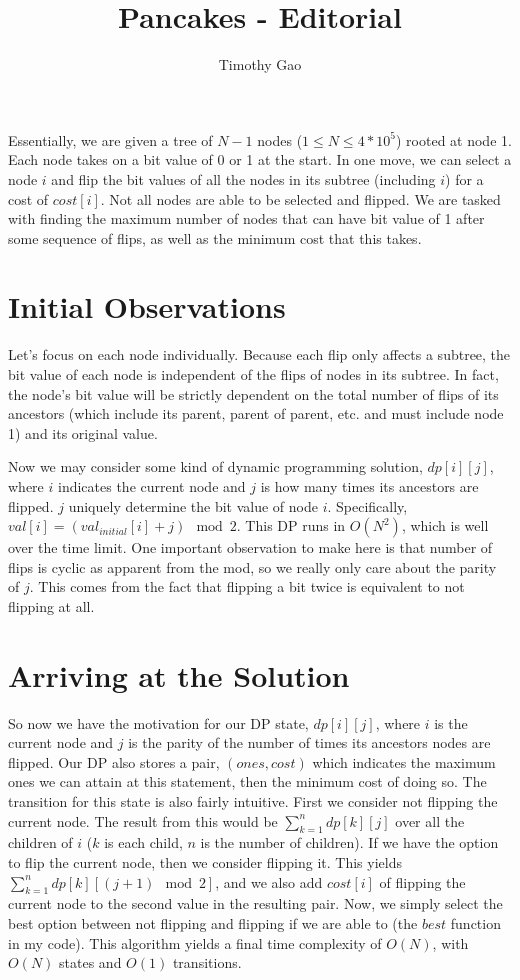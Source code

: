 \documentclass[15pt]{article}
\title{Pancakes - Editorial}
\author{Timothy Gao}
\date{}
\begin{document}
\maketitle

Essentially, we are given a tree of $N-1$ nodes ($1 \leq N \leq 4 * 10^5$) rooted at node 1. Each node takes on a bit value of 0 or 1 at the start. In one move, we can select a node $i$ and flip the bit values of all the nodes in its subtree (including $i$) for a cost of $cost[i]$. Not all nodes are able to be selected and flipped. We are tasked with finding the maximum number of nodes that can have bit value of 1 after some sequence of flips, as well as the minimum cost that this takes.

\section{Initial Observations}

Let's focus on each node individually. Because each flip only affects a subtree, the bit value of each node is independent of the flips of nodes in its subtree. In fact, the node's bit value will be strictly dependent on the total number of flips of its ancestors (which include its parent, parent of parent, etc. and must include node 1) and its original value. 

Now we may consider some kind of dynamic programming solution, $dp[i][j]$, where $i$ indicates the current node and $j$ is how many times its ancestors are flipped. $j$ uniquely determine the bit value of node $i$. Specifically, $val[i] = (val_{initial}[i] + j) \mod 2$. This DP runs in $O(N^2)$, which is well over the time limit. One important observation to make here is that number of flips is cyclic as apparent from the mod, so we really only care about the parity of $j$. This comes from the fact that flipping a bit twice is equivalent to not flipping at all.

\section{Arriving at the Solution}

So now we have the motivation for our DP state, $dp[i][j]$, where $i$ is the current node and $j$ is the parity of the number of times its ancestors nodes are flipped. Our DP also stores a pair, $(ones, cost)$ which indicates the maximum ones we can attain at this statement, then the minimum cost of doing so. The transition for this state is also fairly intuitive. First we consider not flipping the current node. The result from this would be $\sum^{n}_{k=1} dp[k][j]$ over all the children of $i$ ($k$ is each child, $n$ is the number of children). If we have the option to flip the current node, then we consider flipping it. This yields $\sum^{n}_{k=1} dp[k][(j+1) \mod 2]$, and we also add $cost[i]$ of flipping the current node to the second value in the resulting pair. Now, we simply select the best option between not flipping and flipping if we are able to (the $best$ function in my code). This algorithm yields a final time complexity of $O(N)$, with $O(N)$ states and $O(1)$ transitions.
\end{document}
